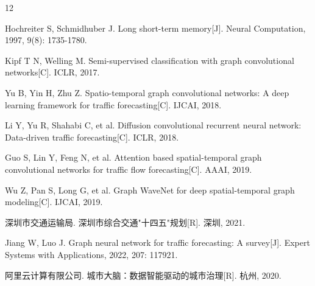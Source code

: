 \documentclass{harryopo-report}
\begin{document}
\printfunding

\begin{thebibliography}{12}

 Hochreiter S, Schmidhuber J. Long short-term memory[J]. Neural Computation, 1997, 9(8): 1735-1780.

 Kipf T N, Welling M. Semi-supervised classification with graph convolutional networks[C]. ICLR, 2017.

 Yu B, Yin H, Zhu Z. Spatio-temporal graph convolutional networks: A deep learning framework for traffic forecasting[C]. IJCAI, 2018.

 Li Y, Yu R, Shahabi C, et al. Diffusion convolutional recurrent neural network: Data-driven traffic forecasting[C]. ICLR, 2018.

 Guo S, Lin Y, Feng N, et al. Attention based spatial-temporal graph convolutional networks for traffic flow forecasting[C]. AAAI, 2019.

 Wu Z, Pan S, Long G, et al. Graph WaveNet for deep spatial-temporal graph modeling[C]. IJCAI, 2019.

 深圳市交通运输局. 深圳市综合交通"十四五"规划[R]. 深圳, 2021.

 Jiang W, Luo J. Graph neural network for traffic forecasting: A survey[J]. Expert Systems with Applications, 2022, 207: 117921.

 阿里云计算有限公司. 城市大脑：数据智能驱动的城市治理[R]. 杭州, 2020.

\end{thebibliography}
\end{document}
